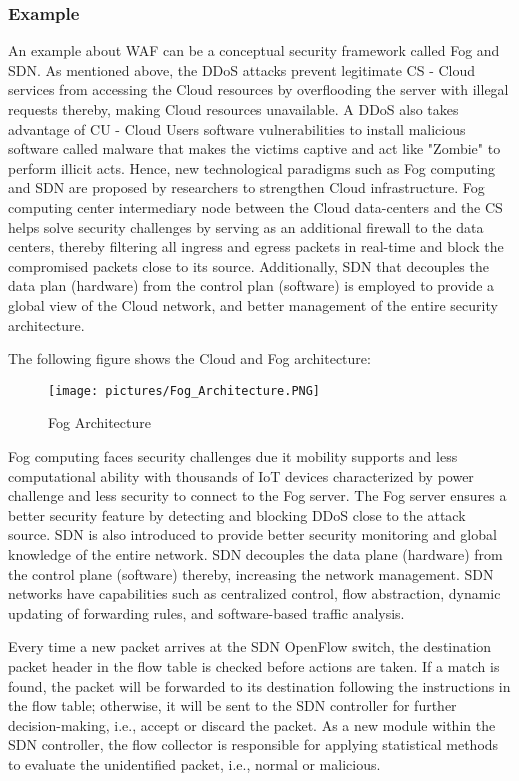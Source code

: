 \documentclass{ijitcs}
\begin{document}
\subsubsection{Example}
An example about WAF can be a conceptual security framework called Fog and SDN. As mentioned above, the DDoS attacks prevent legitimate CS - Cloud services from accessing the Cloud resources by overflooding the server with illegal requests thereby, making Cloud resources unavailable. A DDoS also takes advantage of CU - Cloud Users software vulnerabilities to install malicious software called malware that makes the victims captive and act like "Zombie" to perform illicit acts. Hence, new technological paradigms such as Fog computing and SDN are proposed by researchers\cite{sadiq2020mitigating} to strengthen Cloud infrastructure. Fog computing center intermediary node between the Cloud data-centers and the CS helps solve security challenges by serving as an additional firewall to the data centers, thereby filtering all ingress and egress packets in real-time and block the compromised
packets close to its source. Additionally, SDN that decouples the data plan (hardware) from the control plan (software) is employed to provide a global view of the Cloud network, and better management of the entire security architecture.

The following figure\cite{sadiq2020mitigating} shows the Cloud and Fog architecture:
\begin{figure}[H]
    \centering
    \texttt{[image: pictures/Fog\_Architecture.PNG]}
    \caption{Fog Architecture}
    \label{fig:fogArchi}
\end{figure}
Fog computing faces security challenges due it mobility supports and less computational ability with thousands of IoT devices characterized by power challenge and less security to connect to the Fog server. The Fog server ensures a better security feature by detecting and blocking DDoS close to the attack source. SDN is also introduced to provide better security monitoring and global knowledge of the entire network. SDN decouples the data plane (hardware) from the control plane (software) thereby, increasing the network management. SDN networks have capabilities such as centralized control, flow abstraction, dynamic updating of forwarding rules, and software-based traffic analysis.

Every time a new packet arrives at the SDN OpenFlow switch, the destination packet header in the flow table is checked before actions are taken. If a match is found, the packet will be forwarded to its destination
following the instructions in the flow table; otherwise, it will be sent to the SDN controller for further decision-making, i.e., accept or discard the packet. As a new module within the SDN controller, the flow collector is responsible for applying statistical methods to evaluate the unidentified packet, i.e., normal or malicious.
\end{document}
